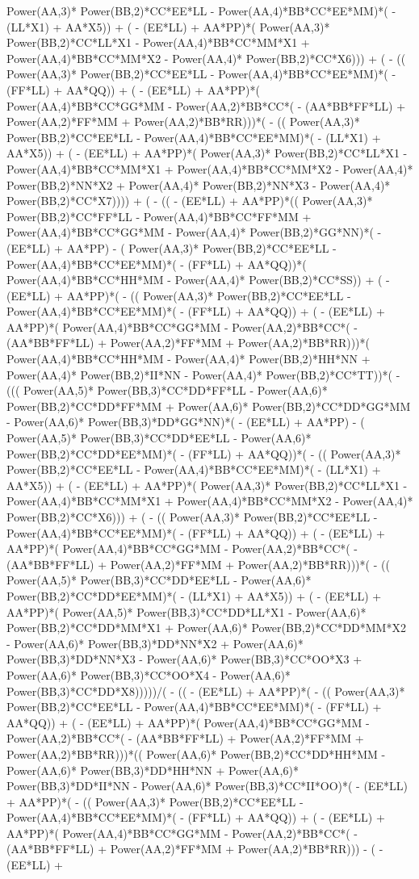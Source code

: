 \documentclass[10pt]{article} %
\begin{document}
Power(AA,3)* Power(BB,2)*CC*EE*LL -  Power(AA,4)*BB*CC*EE*MM)*( - (LL*X1) + AA*X5)) + ( - (EE*LL) + AA*PP)*( Power(AA,3)* Power(BB,2)*CC*LL*X1 -  Power(AA,4)*BB*CC*MM*X1 +  Power(AA,4)*BB*CC*MM*X2 -  Power(AA,4)* Power(BB,2)*CC*X6))) + ( - (( Power(AA,3)* Power(BB,2)*CC*EE*LL -  Power(AA,4)*BB*CC*EE*MM)*( - (FF*LL) + AA*QQ)) + ( - (EE*LL) + AA*PP)*( Power(AA,4)*BB*CC*GG*MM -  Power(AA,2)*BB*CC*( - (AA*BB*FF*LL) +  Power(AA,2)*FF*MM +  Power(AA,2)*BB*RR)))*( - (( Power(AA,3)* Power(BB,2)*CC*EE*LL -  Power(AA,4)*BB*CC*EE*MM)*( - (LL*X1) + AA*X5)) + ( - (EE*LL) + AA*PP)*( Power(AA,3)* Power(BB,2)*CC*LL*X1 -  Power(AA,4)*BB*CC*MM*X1 +  Power(AA,4)*BB*CC*MM*X2 -  Power(AA,4)* Power(BB,2)*NN*X2 +  Power(AA,4)* Power(BB,2)*NN*X3 -  Power(AA,4)* Power(BB,2)*CC*X7)))) + ( - (( - (EE*LL) + AA*PP)*(( Power(AA,3)* Power(BB,2)*CC*FF*LL -  Power(AA,4)*BB*CC*FF*MM +  Power(AA,4)*BB*CC*GG*MM -  Power(AA,4)* Power(BB,2)*GG*NN)*( - (EE*LL) + AA*PP) - ( Power(AA,3)* Power(BB,2)*CC*EE*LL -  Power(AA,4)*BB*CC*EE*MM)*( - (FF*LL) + AA*QQ))*( Power(AA,4)*BB*CC*HH*MM -  Power(AA,4)* Power(BB,2)*CC*SS)) + ( - (EE*LL) + AA*PP)*( - (( Power(AA,3)* Power(BB,2)*CC*EE*LL -  Power(AA,4)*BB*CC*EE*MM)*( - (FF*LL) + AA*QQ)) + ( - (EE*LL) + AA*PP)*( Power(AA,4)*BB*CC*GG*MM -  Power(AA,2)*BB*CC*( - (AA*BB*FF*LL) +  Power(AA,2)*FF*MM +  Power(AA,2)*BB*RR)))*( Power(AA,4)*BB*CC*HH*MM -  Power(AA,4)* Power(BB,2)*HH*NN +  Power(AA,4)* Power(BB,2)*II*NN -  Power(AA,4)* Power(BB,2)*CC*TT))*( - ((( Power(AA,5)* Power(BB,3)*CC*DD*FF*LL -  Power(AA,6)* Power(BB,2)*CC*DD*FF*MM +  Power(AA,6)* Power(BB,2)*CC*DD*GG*MM -  Power(AA,6)* Power(BB,3)*DD*GG*NN)*( - (EE*LL) + AA*PP) - ( Power(AA,5)* Power(BB,3)*CC*DD*EE*LL -  Power(AA,6)* Power(BB,2)*CC*DD*EE*MM)*( - (FF*LL) + AA*QQ))*( - (( Power(AA,3)* Power(BB,2)*CC*EE*LL -  Power(AA,4)*BB*CC*EE*MM)*( - (LL*X1) + AA*X5)) + ( - (EE*LL) + AA*PP)*( Power(AA,3)* Power(BB,2)*CC*LL*X1 -  Power(AA,4)*BB*CC*MM*X1 +  Power(AA,4)*BB*CC*MM*X2 -  Power(AA,4)* Power(BB,2)*CC*X6))) + ( - (( Power(AA,3)* Power(BB,2)*CC*EE*LL -  Power(AA,4)*BB*CC*EE*MM)*( - (FF*LL) + AA*QQ)) + ( - (EE*LL) + AA*PP)*( Power(AA,4)*BB*CC*GG*MM -  Power(AA,2)*BB*CC*( - (AA*BB*FF*LL) +  Power(AA,2)*FF*MM +  Power(AA,2)*BB*RR)))*( - (( Power(AA,5)* Power(BB,3)*CC*DD*EE*LL -  Power(AA,6)* Power(BB,2)*CC*DD*EE*MM)*( - (LL*X1) + AA*X5)) + ( - (EE*LL) + AA*PP)*( Power(AA,5)* Power(BB,3)*CC*DD*LL*X1 -  Power(AA,6)* Power(BB,2)*CC*DD*MM*X1 +  Power(AA,6)* Power(BB,2)*CC*DD*MM*X2 -  Power(AA,6)* Power(BB,3)*DD*NN*X2 +  Power(AA,6)* Power(BB,3)*DD*NN*X3 -  Power(AA,6)* Power(BB,3)*CC*OO*X3 +  Power(AA,6)* Power(BB,3)*CC*OO*X4 -  Power(AA,6)* Power(BB,3)*CC*DD*X8)))))/( - (( - (EE*LL) + AA*PP)*( - (( Power(AA,3)* Power(BB,2)*CC*EE*LL -  Power(AA,4)*BB*CC*EE*MM)*( - (FF*LL) + AA*QQ)) + ( - (EE*LL) + AA*PP)*( Power(AA,4)*BB*CC*GG*MM -  Power(AA,2)*BB*CC*( - (AA*BB*FF*LL) +  Power(AA,2)*FF*MM +  Power(AA,2)*BB*RR)))*(( Power(AA,6)* Power(BB,2)*CC*DD*HH*MM -  Power(AA,6)* Power(BB,3)*DD*HH*NN +  Power(AA,6)* Power(BB,3)*DD*II*NN -  Power(AA,6)* Power(BB,3)*CC*II*OO)*( - (EE*LL) + AA*PP)*( - (( Power(AA,3)* Power(BB,2)*CC*EE*LL -  Power(AA,4)*BB*CC*EE*MM)*( - (FF*LL) + AA*QQ)) + ( - (EE*LL) + AA*PP)*( Power(AA,4)*BB*CC*GG*MM -  Power(AA,2)*BB*CC*( - (AA*BB*FF*LL) +  Power(AA,2)*FF*MM +  Power(AA,2)*BB*RR))) - ( - (EE*LL) + 
\end{document}
